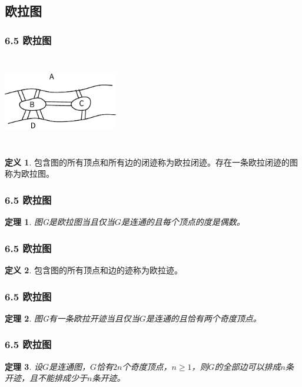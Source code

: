 \documentclass{beamer}
\newtheorem{Thm}{定理}[section]
\theoremstyle{definition}
\newtheorem{Def}{定义}[section]
\theoremstyle{example}
\begin{document}
\begin{CJK*}{UTF8}{gbsn}
\section{欧拉图}
\begin{frame}
  \frametitle{6.5 欧拉图}
\centering
\includegraphics[width=5cm,height=4cm]{konigsberg} 
    \pause
  \begin{Def}
    包含图的所有顶点和所有边的闭迹称为\alert{欧拉闭迹}。存在一条欧拉闭迹的图称为\alert{欧拉图}。
  \end{Def}

\end{frame}


\begin{frame}
  \frametitle{6.5 欧拉图}
  \begin{Thm}
    图G是欧拉图当且仅当$G$是连通的且每个顶点的度是偶数。
  \end{Thm}

\end{frame}

\begin{frame}
  \frametitle{6.5 欧拉图}
  \begin{Def}
    包含图的所有顶点和边的迹称为\alert{欧拉迹}。
  \end{Def}

\end{frame}

\begin{frame}
  \frametitle{6.5 欧拉图}
  \begin{Thm}
    图G有一条欧拉开迹当且仅当$G$是连通的且恰有两个奇度顶点。
  \end{Thm}

\end{frame}


\begin{frame}
  \frametitle{6.5 欧拉图}
  \begin{Thm}
    设$G$是连通图，$G$恰有$2n$个奇度顶点，$n \geq 1$，则$G$的全部边可以排成$n$条
    开迹，且不能排成少于$n$条开迹。  \end{Thm}

\end{frame}


\end{CJK*}
\end{document}
